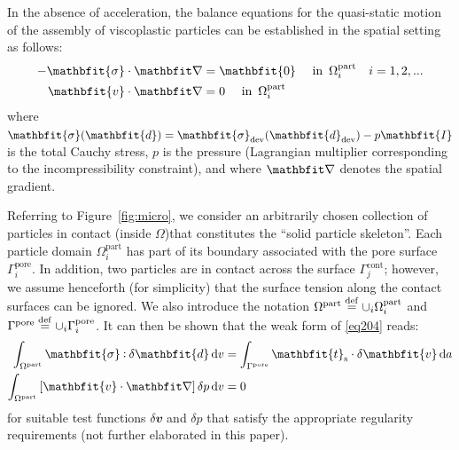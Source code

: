 \documentclass[12pt,a4paper,fleqn]{article}
\renewcommand{\ta}[1]{\mathbfit{#1}}
\renewcommand{\ts}[1]{\mathbfit{#1}}
\newcommand{\figref}[1]{Figure~\ref{#1}}
\newcommand{\pore}{\mathrm{pore}}
\newcommand{\particle}{\mathrm{part}}
\newcommand{\contact}{\mathrm{cont}}
\newcommand{\internal}{\mathrm{int}}
\newcommand{\surf}{\mathrm{s}}
\begin{document}
In the absence of acceleration, the balance equations for the quasi-static motion of the assembly of viscoplastic particles can be established in the spatial setting as follows:
\begin{subequations}\label{eq204}
\begin{align}
    -\ts{\sigma}\cdot\diff & = \ts{0} \quad \mbox{ in }\,\Omega^\particle_i\quad i = 1,2,...
\label{eq204a}
\\
    \ta{v}\cdot\diff & = 0 \quad \mbox{ in }\,\Omega^\particle_i
\label{eq204b}
\end{align}
\end{subequations}
where $\ts{\sigma}(\ts{d})=\ts{\sigma}_\dev(\ts{d}_\dev)-p\ts{I}$ is the total Cauchy stress, $p$ is the pressure (Lagrangian multiplier corresponding to the incompressibility constraint), and
where $\diff$ denotes the spatial gradient.


Referring to \figref{fig:micro}, we consider an arbitrarily chosen collection of particles in contact (inside $\Omega$)that constitutes the ``solid particle skeleton''.
Each particle domain $\Omega_i^\particle$ has part of its boundary associated with the pore surface $\Gamma_i^\pore$.
In addition, two particles are in contact across the surface $\Gamma_j^\contact$; however, we assume henceforth (for simplicity) that the surface tension along the contact surfaces can be ignored.
We also introduce the notation $\Omega^\particle \defeq\cup_i\Omega_i^\particle$ and $\Gamma^\pore \defeq \cup_i\Gamma^\pore_i$.
It can then be shown that the weak form of \eqref{eq204} reads:
\begin{subequations}\label{eq205}
\begin{align}
    \int_{\Omega^\particle} \ts{\sigma}\dprod\delta \ts{d} \dif v
    & =
    \int_{\Gamma^\pore} \ta{t}_\surf \cdot \delta\ta{v} \dif a
\label{eq205a} \\
    \int_{\Omega^\particle} \left[\ta{v}\cdot\diff\right] \delta p \dif v
    & =  0
\label{eq205b}
\end{align}
\end{subequations}
for suitable test functions $\delta\ta{v}$ and $\delta p$ that satisfy the appropriate regularity requirements (not further elaborated in this paper).
\end{document}
